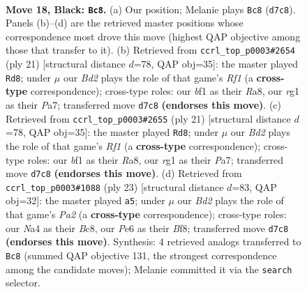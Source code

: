\documentclass[11pt]{article}
\begin{document}
\clearpage

\begin{figure}[p]\centering
\begin{subfigure}{0.46\textwidth}\centering
\resizebox{\linewidth}{!}{%
\newchessgame
\chessboard[
  setfen={1r3b1r/1p1b1k1p/p1n1p1p1/4Pp2/n4B2/5NP1/PP1N1P1P/R1K2BR1 b - - 1 18},
  showmover=false,
  pgfstyle=straightmove, color=movearrow, markmove={d7-c8}
]}
\caption{}
\end{subfigure}\hfill
\begin{subfigure}{0.46\textwidth}\centering
\resizebox{\linewidth}{!}{%
\newchessgame
\chessboard[
  setfen={r1b2rk1/pp2ppbp/n4np1/3P4/3P4/1PN2B2/1P2NPPP/R1B1K2R b KQ - 0 11},
  showmover=false,
  pgfstyle=straightmove, color=movearrow, markmove={f8-d8}
]}
\caption{}
\end{subfigure}
\\[4pt]
\begin{subfigure}{0.46\textwidth}\centering
\resizebox{\linewidth}{!}{%
\newchessgame
\chessboard[
  setfen={r1b2rk1/pp2ppbp/n4np1/3P4/3P4/1PN2B2/1P2NPPP/R1B1K2R b KQ - 0 11},
  showmover=false,
  pgfstyle=straightmove, color=movearrow, markmove={f8-d8}
]}
\caption{}
\end{subfigure}\hfill
\begin{subfigure}{0.46\textwidth}\centering
\resizebox{\linewidth}{!}{%
\newchessgame
\chessboard[
  setfen={r1b1kb1r/ppp2ppp/2p3n1/4P3/P7/2N2N1P/1PP2PP1/R1BR2K1 b - - 0 12},
  showmover=false,
  pgfstyle=straightmove, color=movearrow, markmove={a7-a5}
]}
\caption{}
\end{subfigure}
\caption{\textbf{Move 18, Black: \texttt{Bc8}.} (a) Our position; Melanie plays \texttt{Bc8} (\texttt{d7c8}). Panels (b)--(d) are the retrieved master positions whose correspondence most drove this move (highest QAP objective among those that transfer to it). (b) Retrieved from \texttt{ccrl\_top\_p0003\#2654} (ply 21) [structural distance $d$=78, QAP obj=35]: the master played \texttt{Rd8}; under $\mu$ our \emph{Bd2} plays the role of that game's \emph{Rf1} (a \textbf{cross-type} correspondence); cross-type roles: our \emph{b}f1 as their \emph{R}a8, our \emph{r}g1 as their \emph{P}a7; transferred move \texttt{d7c8} \textbf{(endorses this move)}. (c) Retrieved from \texttt{ccrl\_top\_p0003\#2655} (ply 21) [structural distance $d$=78, QAP obj=35]: the master played \texttt{Rd8}; under $\mu$ our \emph{Bd2} plays the role of that game's \emph{Rf1} (a \textbf{cross-type} correspondence); cross-type roles: our \emph{b}f1 as their \emph{R}a8, our \emph{r}g1 as their \emph{P}a7; transferred move \texttt{d7c8} \textbf{(endorses this move)}. (d) Retrieved from \texttt{ccrl\_top\_p0003\#1088} (ply 23) [structural distance $d$=83, QAP obj=32]: the master played \texttt{a5}; under $\mu$ our \emph{Bd2} plays the role of that game's \emph{Pa2} (a \textbf{cross-type} correspondence); cross-type roles: our \emph{N}a4 as their \emph{B}c8, our \emph{P}e6 as their \emph{B}f8; transferred move \texttt{d7c8} \textbf{(endorses this move)}. Synthesis: 4 retrieved analogs transferred to \texttt{Bc8} (summed QAP objective 131, the strongest correspondence among the candidate moves); Melanie committed it via the \texttt{search} selector.}
\label{fig:thought-m35}
\end{figure}
\end{document}
